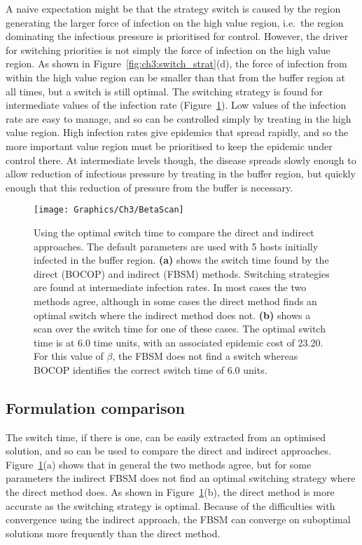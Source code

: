 A naive expectation might be that the strategy switch is caused by the region generating the larger force of infection on the high value region, i.e.\ the region dominating the infectious pressure is prioritised for control. However, the driver for switching priorities is not simply the force of infection on the high value region. As shown in Figure~\ref{fig:ch3:switch_strat}(d), the force of infection from within the high value region can be smaller than that from the buffer region at all times, but a switch is still optimal. The switching strategy is found for intermediate values of the infection rate (Figure~\ref{fig:ch3:beta_scan}). Low values of the infection rate are easy to manage, and so can be controlled simply by treating in the high value region. High infection rates give epidemics that spread rapidly, and so the more important value region must be prioritised to keep the epidemic under control there. At intermediate levels though, the disease spreads slowly enough to allow reduction of infectious pressure by treating in the buffer region, but quickly enough that this reduction of pressure from the buffer is necessary.

\begin{figure}[H]
    \begin{center}
        \texttt{[image: Graphics/Ch3/BetaScan]}
        \caption[Comparing numerical methods using the switching strategy]{Using the optimal switch time to compare the direct and indirect approaches. The default parameters are used with 5 hosts initially infected in the buffer region. \textbf{(a)} shows the switch time found by the direct (BOCOP) and indirect (FBSM) methods. Switching strategies are found at intermediate infection rates. In most cases the two methods agree, although in some cases the direct method finds an optimal switch where the indirect method does not. \textbf{(b)} shows a scan over the switch time for one of these cases. The optimal switch time is at 6.0 time units, with an associated epidemic cost of 23.20. For this value of $\beta$, the FBSM does not find a switch whereas BOCOP identifies the correct switch time of 6.0 units.\label{fig:ch3:beta_scan}}
    \end{center}
\end{figure}

\subsection{Formulation comparison}

The switch time, if there is one, can be easily extracted from an optimised solution, and so can be used to compare the direct and indirect approaches. Figure~\ref{fig:ch3:beta_scan}(a) shows that in general the two methods agree, but for some parameters the indirect FBSM does not find an optimal switching strategy where the direct method does. As shown in Figure~\ref{fig:ch3:beta_scan}(b), the direct method is more accurate as the switching strategy is optimal. Because of the difficulties with convergence using the indirect approach, the FBSM can converge on suboptimal solutions more frequently than the direct method.

